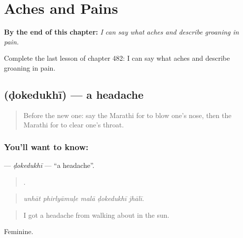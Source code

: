 
\chapter{Aches and Pains}
\label{ch:mr-aches-and-pains}

\begin{chapteropening}
\textbf{By the end of this chapter:} \emph{I can say what aches and describe groaning in pain.}

Complete the last lesson of chapter 482: I can say what aches and describe groaning in pain.
\end{chapteropening}

\section[\texorpdfstring{\mr{डोकेदुखी} (ḍokedukhī)}{डोकेदुखी (ḍokedukhī)}]{ (ḍokedukhī) — a headache}

\label{lesson:MR-C482-dokedukhi}



\begin{quote}
Before the new one: say the Marathi for to blow one's nose, then the Marathi for to clear one's throat.
\end{quote}

\subsection*{You'll want to know: }
\textbf{} — \emph{ḍokedukhī} — \textquotedblleft{}a headache\textquotedblright{}.

\begin{quote}
    .
\end{quote}

\begin{quote}
\emph{unhāt phirlyāmuḷe malā ḍokedukhī jhālī.}
\end{quote}

\begin{quote}
I got a headache from walking about in the sun.
\end{quote}

Feminine.

